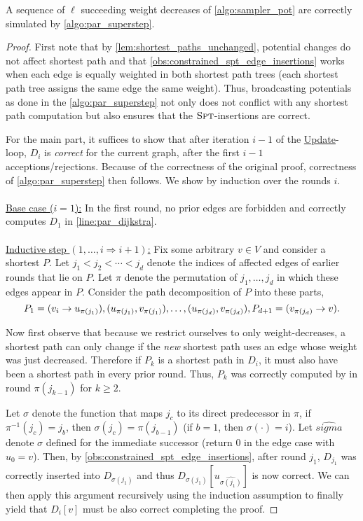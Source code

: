 \begin{lemma}
    A sequence of $\ell$ succeeding weight decreases of \cref{algo:sampler_pot} are correctly simulated by \cref{algo:par_superstep}.
\end{lemma}
\begin{proof}
    First note that by \cref{lem:shortest_paths_unchanged}, potential changes do not affect shortest path and that \cref{obs:constrained_spt_edge_insertions} works when each edge is equally weighted in both shortest path trees (\eg each shortest path tree assigns the same edge the same weight).
    Thus, broadcasting potentials as done in the \cref{algo:par_superstep} not only does not conflict with any shortest path computation but also ensures that the $\textsc{Spt}$-insertions are correct.

    For the main part, it suffices to show that after iteration $i - 1$ of the \underline{Update}-loop, $D_i$ is \emph{correct} for the current graph, \ie after the first $i - 1$ acceptions/rejections.
    Because of the correctness of the original proof, correctness of \cref{algo:par_superstep} then follows.
    We show by induction over the rounds $i$.
    \\ \\
    \underline{Base case ($i = 1$):}
    In the first round, no prior edges are forbidden and \algdk correctly computes $D_1$ in \cref{line:par_dijkstra}.
    \\ \\
    \underline{Inductive step $(1,\ldots,i \Rightarrow i + 1)$:}
    Fix some arbitrary $v \in V$ and consider a shortest  $P$.
    Let $j_1 < j_2 < \cdots < j_d$ denote the indices of affected edges of earlier rounds that lie on $P$.
    Let $\pi$ denote the permutation of $j_1,\ldots,j_d$ in which these edges appear in $P$.
    Consider the path decomposition of $P$ into these parts, \ie \[
        P_1 = (v_i \rightarrow u_{\pi(j_1)}), (u_{\pi(j_1)}, v_{\pi(j_1)}), \ldots, (u_{\pi(j_d)}, v_{\pi(j_d)}), P_{d + 1} = (v_{\pi(j_d)} \rightarrow v).
    \] 
    
    Now first observe that because we restrict ourselves to only weight-decreases, a shortest path can only change if the \emph{new} shortest path uses an edge whose weight was just decreased. 
    Therefore if $P_k$ is a shortest path in $D_i$, it must also have been a shortest path in every prior round.
    Thus, $P_k$ was correctly computed by \algdk in round $\pi(j_{k - 1})$ for $k \geq 2$.

    Let $\sigma$ denote the function that maps $j_c$ to its direct predecessor in $\pi$, \ie if $\pi^{-1}(j_c) = j_b$, then $\sigma(j_c) = \pi(j_{b - 1})$ (if $b = 1$, then $\sigma({\cdot}) = i$).
    Let $\hat{sigma}$ denote $\sigma$ defined for the immediate successor (return $0$ in the edge case with $u_0 = v$).
    Then, by \cref{obs:constrained_spt_edge_insertions}, after round $j_1$, $D_{j_1}$ was correctly inserted into $D_{\sigma(j_1)}$ and thus $D_{\sigma(j_1)}[u_{\hat{\sigma(j_1)}}]$ is now correct.
    We can then apply this argument recursively using the induction assumption to finally yield that $D_i[v]$ must be also correct completing the proof. 
\end{proof}

